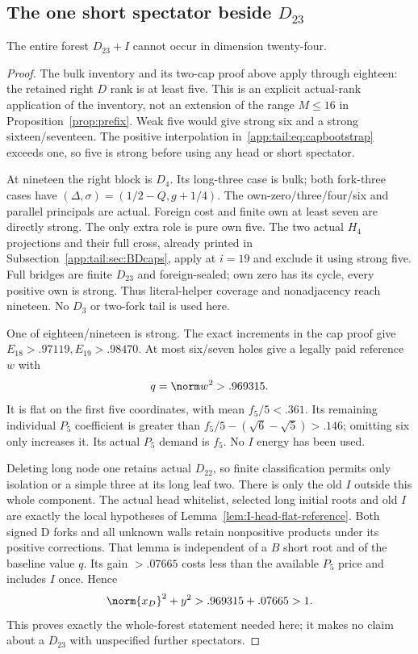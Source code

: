 \subsection{The one short spectator beside $D_{23}$}
\label{app:tail:D23I}
\begin{lemma}
\label{app:tail:lem:D23I}
The entire forest $D_{23}+I$ cannot occur in dimension twenty-four.
\end{lemma}
\begin{proof}
The bulk inventory and its two-cap proof above apply through eighteen:
the retained right $D$ rank is at least five. This is an explicit
actual-rank application of the inventory, not an extension of the
range $M\le16$ in Proposition~\ref{prop:prefix}. Weak five would
give strong six and a strong sixteen/seventeen. The positive
interpolation in~\eqref{app:tail:eq:capbootstrap} exceeds one,
so five is strong before using any head or short spectator.

At nineteen the right block is $D_4$. Its long-three case is bulk;
both fork-three cases have $(\Delta,\sigma)=(1/2-Q,g+1/4)$.
The own-zero/three/four/six and parallel principals are actual.
Foreign cost and finite own at least seven are directly strong.
The only extra role is pure own five. The two actual $H_4$
projections and their full cross, already printed in
Subsection~\ref{app:tail:sec:BDcaps}, apply at $i=19$ and exclude
it using strong five. Full bridges are finite $D_{23}$ and
foreign-sealed; own zero has its cycle, every positive own is strong.
Thus literal-helper coverage and nonadjacency reach nineteen.
No $D_3$ or two-fork tail is used here.

One of eighteen/nineteen is strong. The exact increments in the cap
proof give $E_{18}>.97119,E_{19}>.98470$. At most six/seven holes
give a legally paid reference $w$ with
\[
 q=\norm w^2>.969315.
\]
It is flat on the first five coordinates, with mean $f_5/5<.361$.
Its remaining individual $P_5$ coefficient is greater than
$f_5/5-(\sqrt6-\sqrt5)>.146$; omitting six only increases it.
Its actual $P_5$ demand is $f_5$. No $I$ energy has been used.

Deleting long node one retains actual $D_{22}$, so finite
classification permits only isolation or a simple three at its long
leaf two. There is only the old $I$ outside this whole component.
The actual head whitelist, selected long initial roots and old $I$
are exactly the local hypotheses of
Lemma~\ref{lem:I-head-flat-reference}. Both signed D forks and
all unknown walls retain nonpositive products under its positive
corrections. That lemma is independent of a $B$ short root and
of the baseline value $q$. Its gain $>.07665$ costs less than
the available $P_5$ price and includes $I$ once. Hence
\[
 \norm{x_D}^2+y^2>.969315+.07665>1.
\]
This proves exactly the whole-forest statement needed here; it makes
no claim about a $D_{23}$ with unspecified further spectators.
\end{proof}


